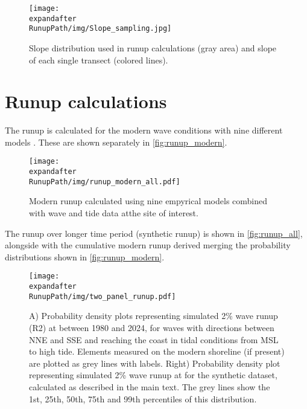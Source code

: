 \documentclass[a4paper, 11pt]{article}
\begin{document}
\begin{figure}[ht]
    \centering
	\texttt{[image: \\expandafter\\RunupPath/img/Slope\_sampling.jpg]}
    \caption{Slope distribution used in runup calculations (gray area) and slope of each single transect (colored lines).}
	\label{fig:slope_image}
\end{figure}

\pagebreak
\section*{Runup calculations}
The runup is calculated for the modern wave conditions with nine different models \citep{STOCKDON2006573,vousdoukas2012coastal,HOLMAN1986527,POWER201947,passarella2018use,senechal2011wave,ATKINSON201715,ruggiero2001wave,nielsen2009coastal}. These are shown separately in \autoref{fig:runup_modern}.

\begin{figure}[ht]
    \centering
	\texttt{[image: \\expandafter\\RunupPath/img/runup\_modern\_all.pdf]}
    \caption{Modern runup calculated using nine empyrical models combined with wave and tide data atthe site of interest.}
	\label{fig:runup_modern}
\end{figure}

\pagebreak
The runup over longer time period (synthetic runup) is shown in \autoref{fig:runup_all}, alongside with the cumulative modern runup derived merging the probability distributions shown in \autoref{fig:runup_modern}.

\begin{figure}[ht]
    \centering
	\texttt{[image: \\expandafter\\RunupPath/img/two\_panel\_runup.pdf]}
    \caption{A) Probability density plots representing simulated 2\% wave runup (R2) at \sitename between 1980 and 2024, for waves with directions between NNE and SSE and reaching the coast in tidal conditions from MSL to high tide. Elements measured on the modern shoreline (if present) are plotted as grey lines with labels. Right) Probability density plot representing simulated 2\% wave runup at \sitename for the synthetic dataset, calculated as described in the main text. The grey lines show the 1st, 25th, 50th, 75th and 99th percentiles of this distribution.}
	\label{fig:runup_all}
\end{figure}

\pagebreak


\end{document}

